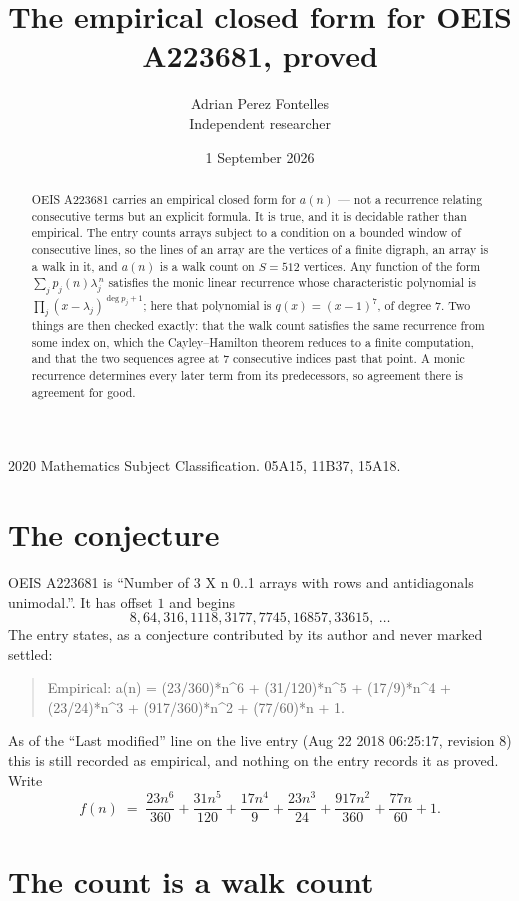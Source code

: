 \documentclass[11pt,a4paper]{article}
\title{The empirical closed form for OEIS A223681, proved}
\author{Adrian Perez Fontelles\\ \small Independent researcher}
\date{1 September 2026}
\theoremstyle{plain}
\theoremstyle{definition}
\begin{document}
\maketitle

\begin{abstract}
OEIS A223681 carries an empirical closed form for $a(n)$ --- not a recurrence relating
consecutive terms but an explicit formula. It is true, and it is decidable rather than
empirical. The entry counts arrays subject to a condition on a bounded window of consecutive lines, so the lines of an array are the
vertices of a finite digraph, an array is a walk in it, and $a(n)$ is a walk count on
$S=512$ vertices. Any function of the form $\sum_j p_j(n)\lambda_j^{\,n}$ satisfies the
monic linear recurrence whose characteristic polynomial is
$\prod_j(x-\lambda_j)^{\deg p_j+1}$; here that polynomial is $q(x)=(x-1)^{7}$, of degree
$7$. Two things are then checked exactly: that the walk count satisfies the same
recurrence from some index on, which the Cayley--Hamilton theorem reduces to a finite
computation, and that the two sequences agree at $7$ consecutive indices past that
point. A monic recurrence determines every later term from its predecessors, so agreement
there is agreement for good.
\end{abstract}

\noindent\small 2020 Mathematics Subject Classification. 05A15, 11B37, 15A18.\normalsize

\section{The conjecture}

OEIS A223681 is ``Number of 3 X n 0..1 arrays with rows and antidiagonals unimodal.''. It has offset $1$ and begins
\[
8, 64, 316, 1118, 3177, 7745, 16857, 33615,\ \dots
\]
The entry states, as a conjecture contributed by its author and never marked settled:
\begin{quote}
Empirical: a(n) = (23/360)*n\^{}6 + (31/120)*n\^{}5 + (17/9)*n\^{}4 + (23/24)*n\^{}3 + (917/360)*n\^{}2 + (77/60)*n + 1.
\end{quote}
As of the ``Last modified'' line on the live entry (Aug 22 2018 06:25:17, revision 8) this is still
recorded as empirical, and nothing on the entry records it as proved. Write
\[
f(n)\;=\;\frac{23 n^{6}}{360} + \frac{31 n^{5}}{120} + \frac{17 n^{4}}{9} + \frac{23 n^{3}}{24} + \frac{917 n^{2}}{360} + \frac{77 n}{60} + 1.
\]

\section{The count is a walk count}
\end{document}
